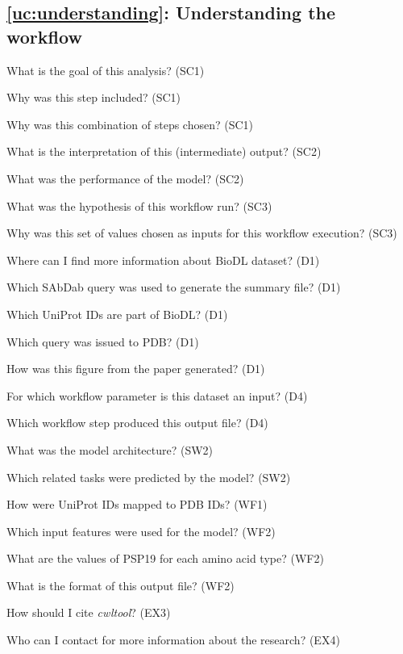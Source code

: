 \subsection{\ref{uc:understanding}: Understanding the workflow}
\begin{provquestions}[resume]
    \item What is the goal of this analysis? (SC1)  
    \item Why was this step included? (SC1)
    \item Why was this combination of steps chosen? (SC1)
    \item What is the interpretation of this (intermediate) output?  (SC2)
    \item What was the performance of the model? (SC2)
    \item What was the hypothesis of this workflow run? (SC3)
    \item Why was this set of values chosen as inputs for this workflow execution? (SC3)
    \item Where can I find more information about BioDL dataset? (D1)
    \item Which SAbDab query was used to generate the summary file? (D1)
    \item Which UniProt IDs are part of BioDL? (D1)
    \item Which query was issued to PDB? (D1)
    \item How was this figure from the paper generated? (D1)
    \item For which workflow parameter is this dataset an input? (D4)
    \item Which workflow step produced this output file? (D4)
    \item What was the model architecture? (SW2)
    \item Which related tasks were predicted by the model? (SW2)
    \item How were UniProt IDs mapped to PDB IDs? (WF1)
    \item Which input features were used for the model? (WF2)
    \item What are the values of PSP19 for each amino acid type? (WF2)
    \item What is the format of this output file? (WF2)
    \item How should I cite \emph{cwltool}? (EX3)
    \item Who can I contact for more information about the research? (EX4)
\end{provquestions}

